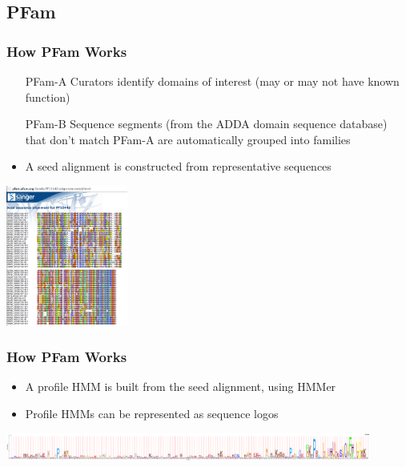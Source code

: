 \documentclass[table]{beamer}
\begin{document}
    \subsection{PFam}
    \begin{frame}
      \frametitle{How PFam Works}   
      \begin{itemize}
        \item [PFam-A] Curators identify domains of interest (may or may not have known function)
        \item [PFam-B] Sequence segments (from the ADDA domain sequence database) that don't match PFam-A are automatically grouped into families
        \item A seed alignment is constructed from representative sequences
      \end{itemize}
      \begin{center}
        \includegraphics[width=0.3\textwidth]{images/pfam1}     
      \end{center}      
    \end{frame}

    \begin{frame}
      \frametitle{How PFam Works}   
      \begin{itemize}
        \item A profile HMM is built from the seed alignment, using HMMer
        \item Profile HMMs can be represented as sequence logos
      \end{itemize}
      \begin{center}
        \includegraphics[width=0.9\textwidth]{images/pfam2} 
      \end{center}      
    \end{frame}
\end{document}
